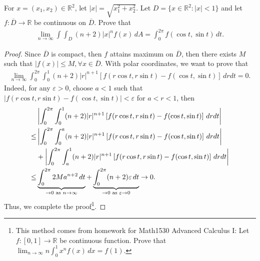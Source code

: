 \documentclass[11pt]{article}
\theoremstyle{definition}
\numberwithin{equation}{subsection}
\begin{document}
For $x = (x_1, x_2) \in \mathbb{R}^2$, let $|x| = \sqrt{x_1^2 + x_2^2}$. Let $D = \{x \in \mathbb{R}^2: |x| < 1\}$ and let $f: \overline{D} \to \mathbb{R}$ be continuous on $\overline{D}$. Prove that
\begin{align*}
    \lim_{n\to\infty} \int\int_D (n + 2)|x|^n f(x)\, dA = \int^{2\pi}_0 f(\cos t, \sin t)\, dt.
\end{align*}
\begin{proof}
Since $\overline{D}$ is compact, then $f$ attains maximum on $\overline{D}$, then there exists $M$ such that $|f(x)| \leq M, \forall x \in \overline{D}$. With polar coordinates, we want to prove that 
\begin{align*}
    \lim_{n\to\infty} \int^{2\pi}_0 \int^1_0 (n+2) |r|^{n+1} \left[f(r\cos t,r\sin t) - f(\cos t, \sin t) \right] \, dr dt = 0.
\end{align*}
Indeed, for any $\varepsilon > 0$, choose $a < 1$ such that $|f(r\cos t,r\sin t) - f(\cos t, \sin t)| < \varepsilon$ for $a < r < 1$, then 
\begin{align*}
    & \left| \int^{2\pi}_0 \int^1_0 (n+2) |r|^{n+1} \left[f(r\cos t,r\sin t) - f(\cos t, \sin t) \right] \, dr dt \right| \\
    \leq & \left| \int^{2\pi}_0 \int^a_0 (n+2) |r|^{n+1} \left[f(r\cos t,r\sin t) - f(\cos t, \sin t) \right] \, dr dt \right| \\
    & + \left| \int^{2\pi}_0 \int^1_a (n+2) |r|^{n+1} \left[f(r\cos t,r\sin t) - f(\cos t, \sin t) \right] \, dr dt \right| \\
    \leq & \underbrace{\int^{2\pi}_0 2 M a^{n+2} \, dt}_{\to 0\,\,{\rm as}\,\, n \to \infty}  + \underbrace{\int^{2\pi}_0 (n+2) \varepsilon \, dt}_{\to 0\,\,{\rm as}\,\, \varepsilon \to 0} \to 0.
\end{align*}
Thus, we complete the proof\footnote{This method comes from homework for Math1530 Advanced Calculus I: Let $f:[0,1] \to \mathbb{R}$ be continuous function. Prove that $\lim_{n\to\infty} n \int^1_0 x^n f(x)\, dx = f(1)$.}.
\end{proof}

\newpage
\end{document}
